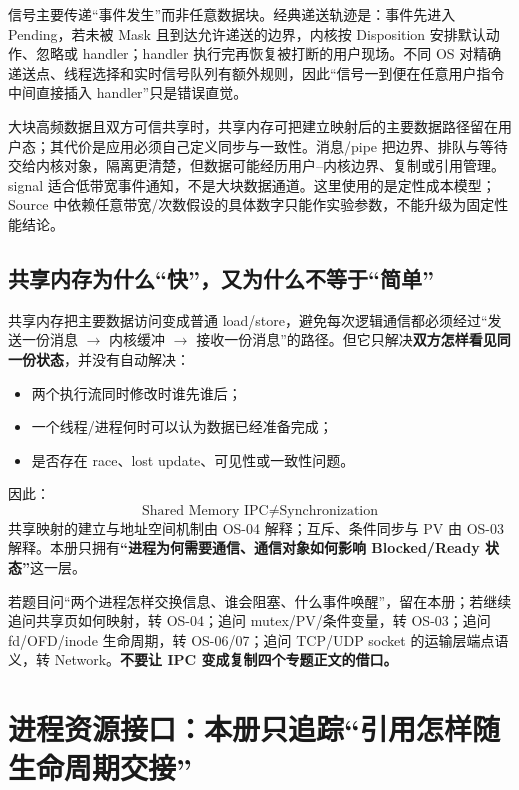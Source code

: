 \documentclass[11pt,a4paper]{ctexart}
\newcommand{\kw}[1]{\textbf{#1}}
\begin{document}
信号主要传递“事件发生”而非任意数据块。经典递送轨迹是：事件先进入 Pending，若未被 Mask 且到达允许递送的边界，内核按 Disposition 安排默认动作、忽略或 handler；handler 执行完再恢复被打断的用户现场。不同 OS 对精确递送点、线程选择和实时信号队列有额外规则，因此“信号一到便在任意用户指令中间直接插入 handler”只是错误直觉。

\begin{method}
大块高频数据且双方可信共享时，共享内存可把建立映射后的主要数据路径留在用户态；其代价是应用必须自己定义同步与一致性。消息/pipe 把边界、排队与等待交给内核对象，隔离更清楚，但数据可能经历用户--内核边界、复制或引用管理。signal 适合低带宽事件通知，不是大块数据通道。这里使用的是定性成本模型；Source 中依赖任意带宽/次数假设的具体数字只能作实验参数，不能升级为固定性能结论。
\end{method}

\subsection{共享内存为什么“快”，又为什么不等于“简单”}

共享内存把主要数据访问变成普通 load/store，避免每次逻辑通信都必须经过“发送一份消息 $\to$ 内核缓冲 $\to$ 接收一份消息”的路径。但它只解决\kw{双方怎样看见同一份状态}，并没有自动解决：
\begin{itemize}
\item 两个执行流同时修改时谁先谁后；
\item 一个线程/进程何时可以认为数据已经准备完成；
\item 是否存在 race、lost update、可见性或一致性问题。
\end{itemize}
因此：
\[
\boxed{\text{Shared Memory IPC}\neq\text{Synchronization}}
\]
共享映射的建立与地址空间机制由 OS-04 解释；互斥、条件同步与 PV 由 OS-03 解释。本册只拥有\kw{“进程为何需要通信、通信对象如何影响 Blocked/Ready 状态”}这一层。

\begin{method}
若题目问“两个进程怎样交换信息、谁会阻塞、什么事件唤醒”，留在本册；若继续追问共享页如何映射，转 OS-04；追问 mutex/PV/条件变量，转 OS-03；追问 fd/OFD/inode 生命周期，转 OS-06/07；追问 TCP/UDP socket 的运输层端点语义，转 Network。\kw{不要让 IPC 变成复制四个专题正文的借口。}
\end{method}

\section{进程资源接口：本册只追踪“引用怎样随生命周期交接”}
\end{document}
